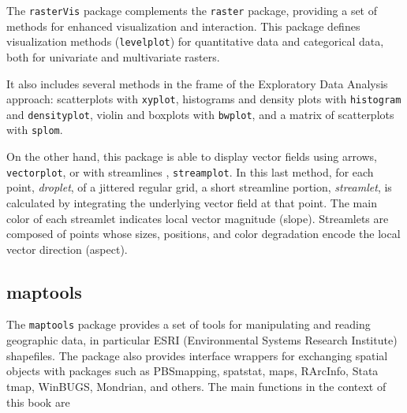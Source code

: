 \documentclass[smallroyalvopaper]{memoir}
\begin{document}
The \texttt{rasterVis} package \cite{Perpinan.Hijmans2013} complements the \texttt{raster} package, providing a set of methods for enhanced visualization and interaction. This package defines visualization methods (\texttt{levelplot}) for quantitative data and categorical data, both for univariate and multivariate rasters.

It also includes several methods in the frame of the Exploratory Data Analysis approach: scatterplots with \texttt{xyplot}, histograms and density plots with \texttt{histogram} and \texttt{densityplot}, violin and boxplots with \texttt{bwplot}, and a matrix of scatterplots with \texttt{splom}.

On the other hand, this package is able to display vector fields using arrows, \texttt{vectorplot}, or with streamlines \cite{Wegenkittl.Groeller1997}, \texttt{streamplot}. In this last method, for each point, \emph{droplet}, of a jittered regular grid, a short streamline portion, \emph{streamlet}, is calculated by integrating the underlying vector field at that point. The main color of each streamlet indicates local vector magnitude (slope). Streamlets are composed of points whose sizes, positions, and color degradation encode the local vector direction (aspect).

\subsection{maptools}
\label{sec:org8f6b526}
\label{sec:maptools}

The \texttt{maptools} package \cite{Bivand.Lewin-Koh2013} provides a set of tools for manipulating and reading geographic data, in particular ESRI (Environmental Systems Research Institute) shapefiles. The package also provides interface wrappers for exchanging spatial objects with packages such as PBSmapping, spatstat, maps, RArcInfo, Stata tmap, WinBUGS, Mondrian, and others. The main functions in the context of this book are
\end{document}
